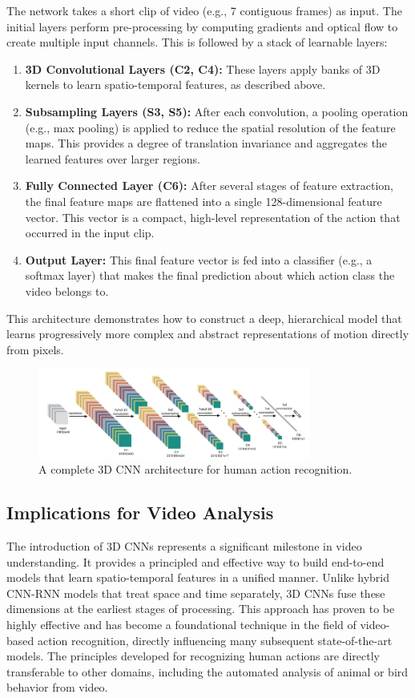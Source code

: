 The network takes a short clip of video (e.g., 7 contiguous frames) as input. The initial layers perform pre-processing by computing gradients and optical flow to create multiple input channels. This is followed by a stack of learnable layers:
\begin{enumerate}
    \item \textbf{3D Convolutional Layers (C2, C4):} These layers apply banks of 3D kernels to learn spatio-temporal features, as described above.
    \item \textbf{Subsampling Layers (S3, S5):} After each convolution, a pooling operation (e.g., max pooling) is applied to reduce the spatial resolution of the feature maps. This provides a degree of translation invariance and aggregates the learned features over larger regions.
    \item \textbf{Fully Connected Layer (C6):} After several stages of feature extraction, the final feature maps are flattened into a single 128-dimensional feature vector. This vector is a compact, high-level representation of the action that occurred in the input clip.
    \item \textbf{Output Layer:} This final feature vector is fed into a classifier (e.g., a softmax layer) that makes the final prediction about which action class the video belongs to.
\end{enumerate}
This architecture demonstrates how to construct a deep, hierarchical model that learns progressively more complex and abstract representations of motion directly from pixels.

\begin{figure}[H]
    \centering
    \includegraphics[width=0.8\textwidth]{archivos/figuras/architecture.jpg} 
    \caption{A complete 3D CNN architecture for human action recognition.}
    \label{fig:3d_arch}
\end{figure}

\subsection{Implications for Video Analysis}

The introduction of 3D CNNs represents a significant milestone in video understanding. It provides a principled and effective way to build end-to-end models that learn spatio-temporal features in a unified manner. Unlike hybrid CNN-RNN models that treat space and time separately, 3D CNNs fuse these dimensions at the earliest stages of processing. This approach has proven to be highly effective and has become a foundational technique in the field of video-based action recognition, directly influencing many subsequent state-of-the-art models. The principles developed for recognizing human actions are directly transferable to other domains, including the automated analysis of animal or bird behavior from video.

